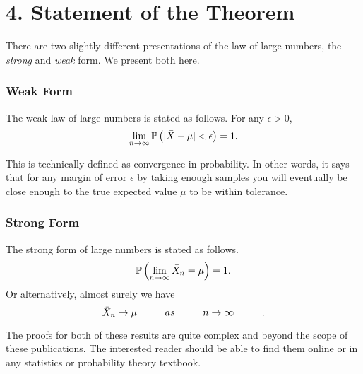 \documentclass[11pt]{article}
\begin{document}
\section*{4. Statement of the Theorem}
There are two slightly different presentations of the law of large numbers, the \textit{strong} and \textit{weak} form. We present both here.

\subsubsection*{Weak Form}
The weak law of large numbers is stated as follows. For any $\epsilon>0$,
\begin{equation}
    \lim_{n\rightarrow \infty} \mathbb{P} \left(| \Bar{X} - \mu | < \epsilon \right) = 1.
\end{equation}

This is technically defined as convergence in probability. In other words, it says that for any margin of error $\epsilon$ by taking enough samples you will eventually be close enough to the true expected value $\mu$ to be within tolerance.

\subsubsection*{Strong Form}
The strong form of large numbers is stated as follows. 
\begin{equation}
    \mathbb{P}\left( \lim_{n \rightarrow \infty} \Bar{X}_n = \mu \right) = 1.
\end{equation}
Or alternatively, almost surely we have
\begin{equation}
    \Bar{X}_n \rightarrow \mu \hspace{1cm} as \hspace{1cm} n \rightarrow \infty \hspace{1cm}.
\end{equation}

The proofs for both of these results are quite complex and beyond the scope of these publications. The interested reader should be able to find them online or in any statistics or probability theory textbook. 
\end{document}
